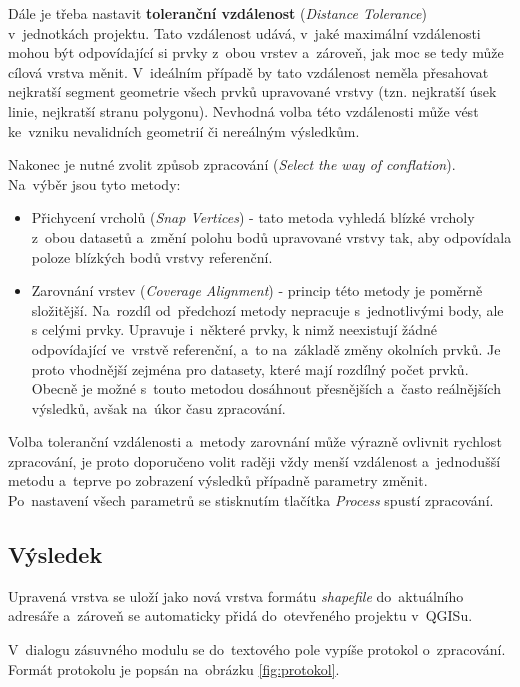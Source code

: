 Dále je třeba nastavit \textbf{toleranční vzdálenost} (\textit{Distance 
Tolerance}) v~jednotkách projektu. Tato vzdálenost udává, v~jaké maximální 
vzdálenosti mohou být odpovídající si prvky z~obou vrstev a~zároveň, jak 
moc se tedy může cílová vrstva měnit. V~ideálním případě by tato vzdálenost 
neměla přesahovat nejkratší segment geometrie všech prvků upravované vrstvy 
(tzn. nejkratší úsek linie, nejkratší stranu polygonu). Nevhodná volba této 
vzdálenosti může vést ke~vzniku nevalidních geometrií či nereálným výsledkům.

Nakonec je nutné zvolit způsob zpracování (\textit{Select the way of conflation}). 
Na~výběr jsou tyto metody:
\begin{itemize}
 \item Přichycení vrcholů (\textit{Snap Vertices}) - tato metoda vyhledá blízké
	vrcholy z~obou datasetů a~změní polohu bodů upravované vrstvy tak, aby
	odpovídala poloze blízkých bodů vrstvy referenční.
 \item Zarovnání vrstev (\textit{Coverage Alignment}) - princip této metody je
	poměrně složitější. Na~rozdíl od~předchozí metody nepracuje s~jednotlivými
	body, ale s celými prvky. Upravuje i~některé prvky, k nimž neexistují 
	žádné odpovídající ve~vrstvě refe\-renční, a~to na~základě změny okolních 
	prvků. Je proto vhodnější zejména pro datasety, které mají rozdílný počet
	prvků. Obecně je možné s~touto metodou dosáhnout přesnějších a~často
	reálnějších výsledků, avšak na~úkor času zpraco\-vání.
\end{itemize}

Volba toleranční vzdálenosti a~metody zarovnání může výrazně ovlivnit rychlost 
zpracování, je proto doporučeno volit raději vždy menší vzdálenost a~jednodušší
metodu a~teprve po zobrazení výsledků případně parametry změnit. Po~nastavení 
všech parametrů se stisknutím tlačítka \textit{Process} spustí zpracování. 

\subsection{Výsledek}
\label{prirucka-vysledek}

Upravená vrstva se uloží jako nová vrstva formátu \textit{shapefile} do~aktuálního 
adresáře a~zároveň se automaticky přidá do~otevřeného projektu v~QGISu.

V~dialogu zásuvného modulu se do~textového pole vypíše protokol o~zpracování.
Formát protokolu je popsán na~obrázku \ref{fig:protokol}.  

